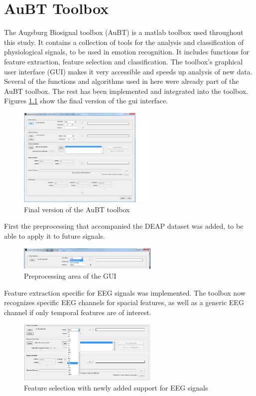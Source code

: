 \documentclass[12pt, a4paper, fleqn]{memoir}%
\begin{document}
\chapter{AuBT Toolbox}
\label{app:aubt}
The Augsburg Biosignal toolbox (AuBT) is a matlab toolbox used throughout this study. It contains a collection of tools for the analysis and classification of physiological signals, to be used in emotion recognition. It includes functions for feature extraction, feature selection and classification. The toolbox's graphical user interface (GUI) makes it very accessible and speeds up analysis of new data. Several of the functions and algorithms used in here were already part of the AuBT toolbox. The rest has been implemented and integrated into the toolbox. Figures \ref{fig:aubt1} show the final version of the gui interface. 

\begin{figure}[h]
	\centering
	\includegraphics[width=0.6\textwidth]{aubt1.png}
	\caption{Final version of the AuBT toolbox}
	\label{fig:aubt1}
\end{figure}

First the preprocessing that accompanied the DEAP dataset was added, to be able to apply it to future signals.
\begin{figure}[h]
	\centering
	\includegraphics[width=0.6\textwidth]{aubt2.png}
	\caption{Preprocessing area of the GUI}
	\label{fig:aubt2}
\end{figure}
Feature extraction specific for EEG signals was implemented. The toolbox now recognizes specific EEG channels for spacial features, as well as a generic EEG channel if only temporal features are of interest.

\begin{figure}[h]
	\centering
	\includegraphics[width=0.6\textwidth]{aubt3.png}
	\caption{Feature selection with newly added support for EEG signals}
	\label{fig:aubt3.jpg}
\end{figure}
\end{document}
